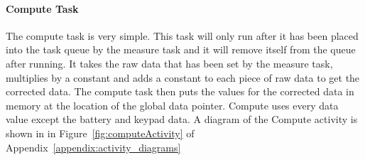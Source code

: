 \documentclass[12pt]{article} %
\begin{document}
    \paragraph{Compute Task} The compute task is very simple. This task will
    only run after it has been placed into the task queue by the measure task
    and it will remove itself from the queue after running. It takes the raw
    data that has been set by the measure task, multiplies by a constant and
    adds a constant to each piece of raw data to get the corrected data. The
    compute task then puts the values for the corrected data in memory at the
    location of the global data pointer. Compute uses every data value except
    the battery and keypad data. A diagram of the Compute activity is shown in
		in Figure~\ref{fig:computeActivity} of Appendix~\ref{appendix:activity_diagrams}
\end{document}

